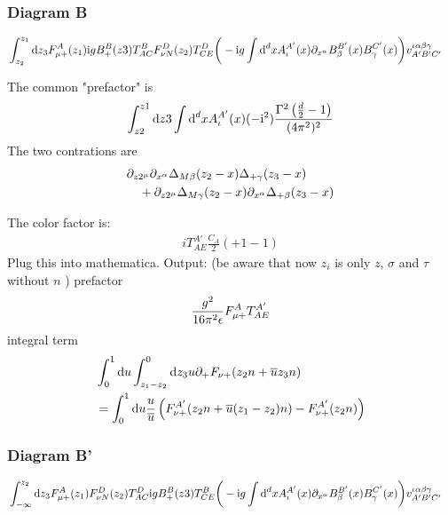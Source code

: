 \subsubsection{Diagram B}
\begin{align}
&\int_{z_2}^{z_1}\text{d} z_3F_{\mu +}^{A}(z_1)\text{i} g B_+^B(z3)  T^B_{AC}F _{\nu N}^D(z_2) T^D_{CE}\bigg(-\text{i} g \int \text{d} ^d xA_\iota^{A'}(x) \partial_{x^\alpha} B_\beta^{B'} (x) B_\gamma^{C'}(x) \bigg) v^{\iota \alpha\beta\gamma}_{A'B'C'}
\end{align}

The common "prefactor" is
\begin{align}
\int_{z2}^{z1} \text{d} z3 \int \text{d} ^d x A_\iota^{A'}(x) (- \text{i} ^2) \frac{\Gamma^2\left(\frac{d}{2}-1\right)}{(4\pi^2)^2}
\end{align}
The two contrations are
\begin{align}
&\partial_{z2^{\mu}}\partial_{x^{\alpha}}\Delta_{M\beta}(z_2 -x )\Delta_{+\gamma}(z_3 -x )
\\&~~~
+\partial_{z2^{\mu}}\Delta_{M\gamma}(z_2 -x )\partial_{x^{\alpha}}\Delta_{+\beta}(z_3 -x )
\end{align}

The color factor is:
\begin{align}
i T^{A'}_{AE}\frac{C_A}{2}(+1-1)
\end{align}
Plug this into mathematica.
Output: (be aware that now $z_i$ is only $z$, $\sigma$ and $\tau$ without $n$ )
prefactor
\begin{align}
\frac{g^2}{16 \pi^2 \epsilon} F_{\mu +}^A T^{A'}_{AE}
\end{align}
integral term
\begin{align}
&\int_0^1 \text{d} u \int_{z_1 -z_2}^{0} \text{d} z_3 u \partial_+ F_{\nu +}(z_2 n + \overline u z_3 n)
\\
&=\int_0^1 \text{d} u \frac{u}{\overline u} \left(F_{\nu +}^{A'}(z_2n+\overline u(z_1-z_2)n)-F_{\nu +}^{A'}(z_2n)\right)
\end{align}

\subsubsection{Diagram B'}
\begin{align}
&\int_{-\infty}^{z_2}\text{d} z_3F_{\mu +}^{A}(z_1)F _{\nu N}^D(z_2) T^D_{AC}\text{i} g B_+^B(z3)  T^B_{CE}\bigg(-\text{i} g \int \text{d} ^d xA_\iota^{A'}(x) \partial_{x^\alpha} B_\beta^{B'} (x) B_\gamma^{C'}(x) \bigg) v^{\iota \alpha\beta\gamma}_{A'B'C'}
\end{align}

